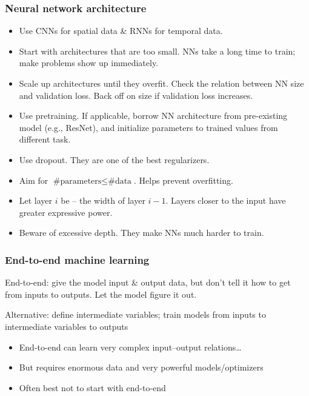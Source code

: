 \begin{frame}
    \frametitle{Neural network architecture}
    \begin{itemize}[<+->]
        \item \alert{Use CNNs for spatial data \& RNNs for temporal data.}
        \item \alert{Start with architectures that are too small.}
        NNs take a long time to train; make problems show up immediately.
        \item \alert{Scale up architectures until they overfit.}
        Check the relation between NN size and validation loss.
        Back off on size if validation loss increases.
        \item \alert{Use pretraining.}
        If applicable, borrow NN architecture from pre-existing model (e.g., ResNet), and initialize parameters to trained values from different task.
        \item \alert{Use dropout.}
        They are one of the best regularizers.
        \item \alert{Aim for $\text{\# parameters} \le \text{\# data}$.}
        Helps prevent overfitting.
        \item \alert{Let layer $i$ be -- the width of layer $i - 1$.}
        Layers closer to the input have greater expressive power.
        \item \alert{Beware of excessive depth.}
        They make NNs much harder to train.
    \end{itemize}
\end{frame}

\begin{frame}
    \frametitle{End-to-end machine learning}

    \begin{block}{}
        \alert{End-to-end}: give the model input \& output data, but don't tell it how to get from inputs to outputs.
        Let the model figure it out.
    \end{block}

    \begin{center}
        
    \end{center}
    \pause

    \begin{block}{}
        Alternative: define intermediate variables; train models from inputs to intermediate variables to outputs
    \end{block}

    \begin{center}
        
    \end{center}
    \pause

    \begin{itemize}
        \item End-to-end can learn very complex input--output relations\ldots
        \item But requires enormous data and very powerful models/optimizers
        \item Often best not to start with end-to-end
    \end{itemize}
\end{frame}

